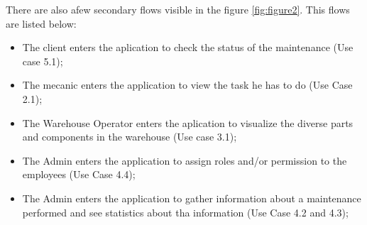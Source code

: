 There are also afew secondary flows visible in the figure \ref{fig:figure2}. 
This flows are listed below:
\begin{itemize}
  \item The client enters the aplication to check the status of the maintenance (Use case 5.1);
  \item The mecanic enters the application to view the task he has to do (Use Case 2.1); 
  \item The Warehouse Operator enters the aplication to visualize the diverse parts and components in the warehouse (Use case 3.1); 
  \item The Admin enters the application to assign roles and/or permission to the employees (Use Case 4.4); 
  \item The Admin enters the application to gather information about a maintenance performed and see statistics about tha information (Use Case 4.2 and 4.3); 
\end{itemize}










